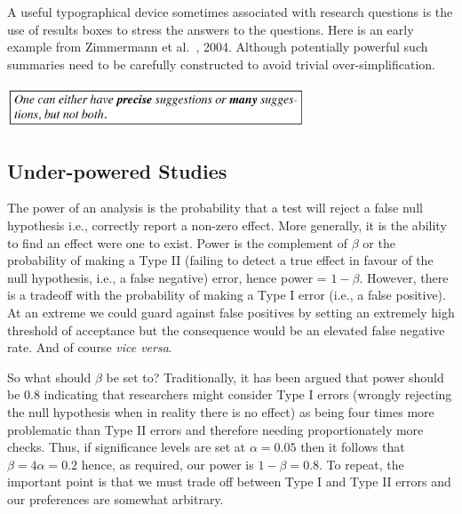 \documentclass[preprint,10pt]{elsarticle}
\newcommand{\RED}{\color{red}}
\newcommand{\BLACK}{\color{black}}
\begin{document}
A useful typographical device sometimes associated with research questions is the use of results boxes to stress the answers to the questions. Here is an early example from Zimmermann et al.~\cite{Zimmermann04}, 2004. Although potentially powerful such summaries need to be carefully constructed to avoid trivial over-simplification.

\centerline{\includegraphics[width=3.5in]{fig/resultbox.png}}



\subsection{Under-powered Studies}

The power of an analysis is the probability that a test will reject a false null hypothesis i.e., correctly report a non-zero effect. \RED More generally, it is the ability to find an effect were one to exist.  Power \BLACK is the complement of $\beta$ or the probability of making a Type II (failing to detect a true effect in favour of the null hypothesis, i.e., a false negative) error, hence power = $1 - \beta$.  
\RED However, there is a tradeoff with the probability of making a Type I error (i.e., a false positive).  At an extreme we could guard against false positives by setting an extremely high threshold of acceptance but the consequence would be an elevated false negative rate.  And of course \textit{vice versa}. \BLACK

\RED So what should $\beta$ be set to?  \BLACK Traditionally, it has been argued that power should be 0.8 \cite{Cohe88} indicating that researchers might consider Type I errors (wrongly rejecting the null hypothesis when in reality there is no effect) as being four times more problematic than Type II errors and therefore needing proportionately more checks. Thus, if significance levels are set at $\alpha=0.05$ then it follows that $\beta = 4\alpha = 0.2$ hence, as required, our power is $1 - \beta = 0.8$.  To repeat, the important point is that we must trade off between Type I and Type II errors and our preferences are somewhat arbitrary.
\end{document}
